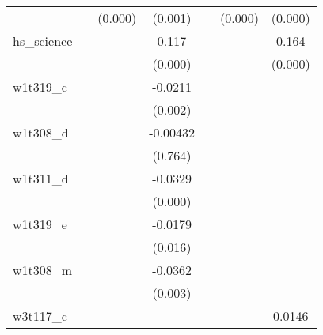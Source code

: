 {\begin{tabular}{l*{6}{c}}
            &                     &     (0.000)         &     (0.001)         &                     &     (0.000)         &     (0.000)         \\
[1em]
hs\_science  &                     &                     &       0.117\sym{***}&                     &                     &       0.164\sym{***}\\
            &                     &                     &     (0.000)         &                     &                     &     (0.000)         \\
[1em]
w1t319\_c    &                     &                     &     -0.0211\sym{***}&                     &                     &                     \\
            &                     &                     &     (0.002)         &                     &                     &                     \\
[1em]
w1t308\_d    &                     &                     &    -0.00432         &                     &                     &                     \\
            &                     &                     &     (0.764)         &                     &                     &                     \\
[1em]
w1t311\_d    &                     &                     &     -0.0329\sym{***}&                     &                     &                     \\
            &                     &                     &     (0.000)         &                     &                     &                     \\
[1em]
w1t319\_e    &                     &                     &     -0.0179\sym{**} &                     &                     &                     \\
            &                     &                     &     (0.016)         &                     &                     &                     \\
[1em]
w1t308\_m    &                     &                     &     -0.0362\sym{***}&                     &                     &                     \\
            &                     &                     &     (0.003)         &                     &                     &                     \\
[1em]
w3t117\_c    &                     &                     &                     &                     &                     &      0.0146\sym{***}\\

\end{tabular}}
